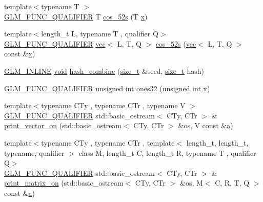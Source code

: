 \begin{DoxyCompactItemize}
\item 
{\footnotesize template$<$typename T $>$ }\\\hyperlink{setup_8hpp_a33fdea6f91c5f834105f7415e2a64407}{G\+L\+M\+\_\+\+F\+U\+N\+C\+\_\+\+Q\+U\+A\+L\+I\+F\+I\+ER} T \hyperlink{namespaceglm_1_1detail_a09055f8d723109dc95c8cc2309e20acc}{cos\+\_\+52s} (T \hyperlink{_s_d_l__opengl_8h_ad0e63d0edcdbd3d79554076bf309fd47}{x})
\item 
{\footnotesize template$<$length\+\_\+t L, typename T , qualifier Q$>$ }\\\hyperlink{setup_8hpp_a33fdea6f91c5f834105f7415e2a64407}{G\+L\+M\+\_\+\+F\+U\+N\+C\+\_\+\+Q\+U\+A\+L\+I\+F\+I\+ER} \hyperlink{structglm_1_1vec}{vec}$<$ L, T, Q $>$ \hyperlink{namespaceglm_1_1detail_af69b36906b6e079461bf24ba03c89e73}{cos\+\_\+52s} (\hyperlink{structglm_1_1vec}{vec}$<$ L, T, Q $>$ const \&\hyperlink{_s_d_l__opengl_8h_ad0e63d0edcdbd3d79554076bf309fd47}{x})
\item 
\hyperlink{setup_8hpp_a4603970cbd724c5d102bbcf17f430047}{G\+L\+M\+\_\+\+I\+N\+L\+I\+NE} \hyperlink{_s_d_l__opengles2__gl2ext_8h_ae5d8fa23ad07c48bb609509eae494c95}{void} \hyperlink{namespaceglm_1_1detail_a391b3eb8d7f4662a1b31046bd69f2755}{hash\+\_\+combine} (\hyperlink{_s_d_l__config__winrt_8h_a7c94ea6f8948649f8d181ae55911eeaf}{size\+\_\+t} \&seed, \hyperlink{_s_d_l__config__winrt_8h_a7c94ea6f8948649f8d181ae55911eeaf}{size\+\_\+t} hash)
\item 
\hyperlink{setup_8hpp_a33fdea6f91c5f834105f7415e2a64407}{G\+L\+M\+\_\+\+F\+U\+N\+C\+\_\+\+Q\+U\+A\+L\+I\+F\+I\+ER} unsigned int \hyperlink{namespaceglm_1_1detail_a2699e3b3ea6ad8d4bb99aed56761582c}{ones32} (unsigned int \hyperlink{_s_d_l__opengl_8h_ad0e63d0edcdbd3d79554076bf309fd47}{x})
\item 
{\footnotesize template$<$typename C\+Ty , typename C\+Tr , typename V $>$ }\\\hyperlink{setup_8hpp_a33fdea6f91c5f834105f7415e2a64407}{G\+L\+M\+\_\+\+F\+U\+N\+C\+\_\+\+Q\+U\+A\+L\+I\+F\+I\+ER} std\+::basic\+\_\+ostream$<$ C\+Ty, C\+Tr $>$ \& \hyperlink{namespaceglm_1_1detail_a9d760c8d2e4e01ac441fcbba7d387055}{print\+\_\+vector\+\_\+on} (std\+::basic\+\_\+ostream$<$ C\+Ty, C\+Tr $>$ \&os, V const \&\hyperlink{_s_d_l__opengl__glext_8h_a3309789fc188587d666cda5ece79cf82}{a})
\item 
{\footnotesize template$<$typename C\+Ty , typename C\+Tr , template$<$ length\+\_\+t, length\+\_\+t, typename, qualifier $>$ class M, length\+\_\+t C, length\+\_\+t R, typename T , qualifier Q$>$ }\\\hyperlink{setup_8hpp_a33fdea6f91c5f834105f7415e2a64407}{G\+L\+M\+\_\+\+F\+U\+N\+C\+\_\+\+Q\+U\+A\+L\+I\+F\+I\+ER} std\+::basic\+\_\+ostream$<$ C\+Ty, C\+Tr $>$ \& \hyperlink{namespaceglm_1_1detail_a45b170ea667900227c6849ad1dfe1bf5}{print\+\_\+matrix\+\_\+on} (std\+::basic\+\_\+ostream$<$ C\+Ty, C\+Tr $>$ \&os, M$<$ C, R, T, Q $>$ const \&\hyperlink{_s_d_l__opengl__glext_8h_a3309789fc188587d666cda5ece79cf82}{a})

\end{DoxyCompactItemize}
